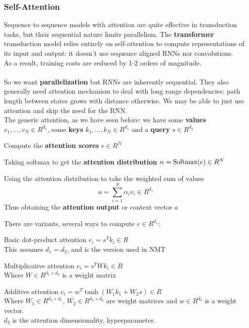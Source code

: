\documentclass[10pt]{report}
\begin{document}
\subsubsection{Self-Attention}
Sequence to sequence models with attention are quite effective in transduction tasks, but their sequential nature limits parallelism. The \textbf{transformer} transduction model relies entirely on self-attention to compute representations of its input and output: it doesn't use sequence aligned RNNs nor convolutions.\\
As a result, training costs are reduced by 1-2 orders of magnitude.\\\\
So we want \textbf{parallelization} but RNNs are inherently sequential. They also generally need attention mechanism to deal with long range dependencies: path length between states grows with distance otherwise. We may be able to just use attention and skip the need for the RNN.\\
The generic attention, as we have seen before: we have some \textbf{values} $v_1,\ldots,v_N\in R^{d_1}$, some \textbf{keys} $k_1,\ldots,k_N\in R^{d_1}$ and a \textbf{query} $s\in R^{d_2}$\begin{list}{}{}
	\item Compute the \textbf{attention scores} $e\in R^N$
	\item Taking softmax to get the \textbf{attention distribution} $\alpha=\hbox{Softmax}(e)\in R^N$
	\item Using the attention distribution to take the weighted sum of values $$a = \sum_{i=1}^N\alpha_iv_i\in R^{d_1}$$
	Thus obtaining the \textbf{attention output} or context vector $a$
\end{list}
There are variants, several ways to compute $e\in R^{d_1}$:
\begin{list}{}{}
	\item Basic dot-product attention $e_i=s^Tk_i\in R$\\
	This assumes $d_1=d_2$, and is the version used in NMT
	\item Multiplicative attention $e_i=s^TWk_i\in R$\\
	Where $W\in R^{d_1\times d_2}$ is a weight matrix
	\item Additive attention $e_i=w^T\tanh(W_1k_1+W_2s)\in R$\\
	Where $W_1\in R^{d_3\times d_1}$, $W_2\in R^{d_3\times d_2}$ are weight matrices and $w\in R^{d_3}$ is a weight vector.\\$d_3$ is the attention dimensionality, hyperparameter.
\end{list}
\end{document}
